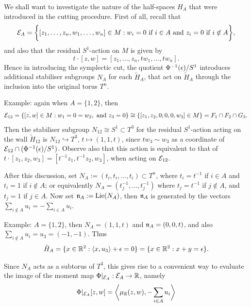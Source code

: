 We shall want to investigate the nature of the half-spaces $H_{A}$ that were introduced in the cutting procedure. First of all, recall that
\begin{equation*}
	\mathcal{E}_{A} = \bigg\{ [z_{1}, \ldots, z_{n}, w_{1}, \ldots, w_{n}] \in M : w_{i} = 0 \text{ if } i \in A \text{ and } z_{i} = 0 \text{ if } i \not\in A \bigg\},
\end{equation*}
and also that the residual $S^{1}$-action on $M$ is given by
\begin{equation*}
	t\cdot [z,w] = [z_{1}, \ldots, z_{n}, tw_{1}, \ldots, tw_{n}].
\end{equation*}
Hence in introducing the symplectic cut, the quotient $\Phi^{-1}(\epsilon)/S^{1}$ introduces additional stabiliser subgroups $N_{A}$ for each $\tilde{H}_{A}$, that act on $\tilde{H}_{A}$ through the inclusion into the original torus $T^{n}$.

Example: again when $A = \{1,2\}$, then
\begin{equation*}
	\mathcal{E}_{12} = \{ [z,w] \in M : w_{1} = 0 = w_{2},\text{ and } z_{3} = 0 \} \cong \{ [z_{1}, z_{2}, 0; 0, 0, w_{3}] \in M \} = F_{1}\cap F_{2} \cap G_{3}.
\end{equation*}
Then the stabiliser subgroup $N_{12} \cong S^{1} \subset T^{3}$ for the residual $S^{1}$-action acting on the wall $\tilde{H}_{12}$ is $N_{12} \hookrightarrow T^{3}$, $t \mapsto (1,1,t)$, since $tw_{3} \sim w_{3}$ as a coordinate of $\mathcal{E}_{12} \cap (\Phi^{-1}(\epsilon)/S^{1})$. Observe also that this action is equivalent to that of $t\cdot[z_{1}, z_{2}, w_{3}] = [t^{-1}z_{1}, t^{-1}z_{2}, w_{3}]$, when acting on $\mathcal{E}_{12}$.

After this discussion, set $N_{A} := (t_{i}, t_{i}, \ldots , t_{i} ) \subset T^{n}$, where $t_{i} = t^{-1}$ if $i \in A$ and $t_{i} = 1$ if $i \not\in A$; or equivalently $N_{A} = (t_{j}^{-1}, \ldots, t_{j}^{-1})$ where $t_{j} = t^{-1}$ if $j \not\in A$, and $t_{j} = 1$ if $j \in A$. Now set $\mathfrak{n}_{A} := \operatorname{\text{Lie}}(N_{A})$, then $\mathfrak{n}_{A}$ is generated by the vectors $\sum_{i \not\in A}u_{i} = -\sum_{i \in A}u_{i}$.

Example: $A = \{1,2\}$, then $N_{A} = (1,1,t)$ and $\mathfrak{n}_{A} = (0,0,t)$, and also $\sum_{i \not\in A} u_{i} = u_{3} = (-1,-1)$. Thus
\begin{equation*}
	\tilde{H}_{A} = \{ x \in \mathbb{R}^{2} : \langle x, u_{3} \rangle + \epsilon = 0 \} = \{ x \in \mathbb{R}^{2} : x + y = \epsilon \}.
\end{equation*}

Since $N_{A}$ acts as a subtorus of $T^{3}$, this gives rise to a convenient way to evaluate the image of the moment map $\Phi |_{\mathcal{E}_{A}} : \mathcal{E}_{A} \rightarrow \mathbb{R}$, namely
\begin{equation*}
	\Phi |_{\mathcal{E}_{A}}[z,w] = \bigg\langle \mu_{\mathbb{R}}(z,w) , -\sum_{i \in A} u_{i} \bigg\rangle
\end{equation*}

